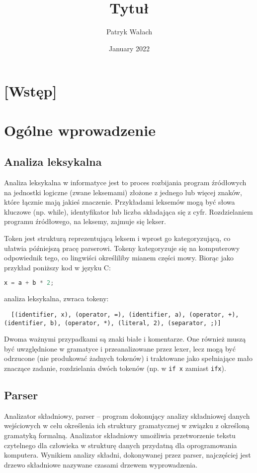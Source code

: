 \documentclass{article}
\title{Tytuł}
\author{Patryk Wałach}
\date{January 2022}
\begin{document}
\maketitle
\tableofcontents

\section{[Wstęp]}

\section{Ogólne wprowadzenie}
\subsection{Analiza leksykalna}
Analiza leksykalna w informatyce jest to proces rozbijania program źródłowych na jednostki logiczne (zwane leksemami) złożone z jednego lub więcej znaków, które łącznie mają jakieś znaczenie\cite{Hopcroft__Motwani__Ullman__2005}. Przykładami leksemów mogą być słowa kluczowe (np. while), identyfikator lub liczba składająca się z cyfr. Rozdzielaniem programu źródłowego, na leksemy, zajmuje się lekser. 

Token jest strukturą reprezentującą leksem i wprost go kategoryzującą\cite{ Aho__Sethi__Ullman__1985}, co ułatwia późniejszą pracę parserowi. Tokeny kategoryzuje się na komputerowy odpowiednik tego, co lingwiści określiliby mianem części mowy. Biorąc jako przykład poniższy kod w języku C:
\begin{lstlisting}[language=c]
  x = a + b * 2;
\end{lstlisting}
analiza leksykalna, zwraca tokeny:
\begin{lstlisting}
  [(identifier, x), (operator, =), (identifier, a), (operator, +), (identifier, b), (operator, *), (literal, 2), (separator, ;)]
\end{lstlisting}
Dwoma ważnymi przypadkami są znaki białe i komentarze. One również muszą być uwzględnione w gramatyce i przeanalizowane przez lexer, lecz mogą być odrzucone (nie produkować żadnych tokenów) i traktowane jako spełniające mało znaczące zadanie, rozdzielania dwóch tokenów (np. w \lstinline{if x} zamiast \lstinline{ifx}).

\subsection{Parser}
Analizator składniowy, parser – program dokonujący analizy składniowej danych wejściowych w celu określenia ich struktury gramatycznej w związku z określoną gramatyką formalną. Analizator składniowy umożliwia przetworzenie tekstu czytelnego dla człowieka w strukturę danych przydatną dla oprogramowania komputera. Wynikiem analizy składni, dokonywanej przez parser, najczęściej jest drzewo składniowe nazywane czasami drzewem wyprowadzenia\cite{Aho__Sethi__Ullman__1985}.
\end{document}
